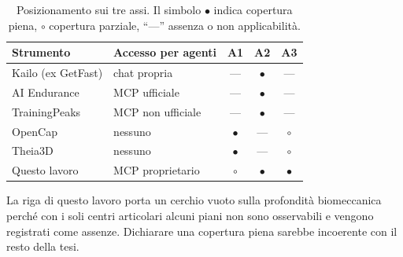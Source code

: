 \begin{table}[htbp]
\centering
\caption{Posizionamento sui tre assi. Il simbolo $\bullet$ indica copertura
piena, $\circ$ copertura parziale, ``---'' assenza o non applicabilità.}
\label{tab:ch5:sintesi}
\begin{tabularx}{\textwidth}{Xlccc}
\toprule
\textbf{Strumento} & \textbf{Accesso per agenti} & \textbf{A1} & \textbf{A2} &
  \textbf{A3} \\
\midrule
Kailo (ex GetFast) & chat propria & --- & $\bullet$ & --- \\
AI Endurance & MCP ufficiale & --- & $\bullet$ & --- \\
TrainingPeaks & MCP non ufficiale & --- & $\bullet$ & --- \\
OpenCap & nessuno & $\bullet$ & --- & $\circ$ \\
Theia3D & nessuno & $\bullet$ & --- & $\circ$ \\
Questo lavoro & MCP proprietario & $\circ$ & $\bullet$ & $\bullet$ \\
\bottomrule
\end{tabularx}
\end{table}

La riga di questo lavoro porta un cerchio vuoto sulla profondità biomeccanica 
perché con i soli centri articolari alcuni piani non sono osservabili e vengono
registrati come assenze. Dichiarare una copertura piena sarebbe incoerente con
il resto della tesi.
